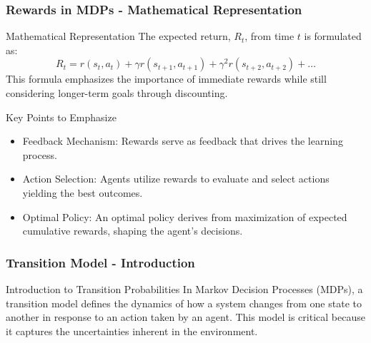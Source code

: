 \documentclass[aspectratio=169]{beamer}
\begin{document}
\begin{frame}[fragile]
    \frametitle{Rewards in MDPs - Mathematical Representation}
    \begin{block}{Mathematical Representation}
        The expected return, $R_t$, from time $t$ is formulated as:
        \begin{equation}
            R_t = r(s_t, a_t) + \gamma r(s_{t+1}, a_{t+1}) + \gamma^2 r(s_{t+2}, a_{t+2}) + \ldots
        \end{equation}
        This formula emphasizes the importance of immediate rewards while still considering longer-term goals through discounting.
    \end{block}

    \begin{block}{Key Points to Emphasize}
        \begin{itemize}
            \item Feedback Mechanism: Rewards serve as feedback that drives the learning process.
            \item Action Selection: Agents utilize rewards to evaluate and select actions yielding the best outcomes.
            \item Optimal Policy: An optimal policy derives from maximization of expected cumulative rewards, shaping the agent's decisions.
        \end{itemize}
    \end{block}
\end{frame}

\begin{frame}[fragile]
    \frametitle{Transition Model - Introduction}
    \begin{block}{Introduction to Transition Probabilities}
        In Markov Decision Processes (MDPs), a transition model defines the dynamics of how a system changes from one state to another in response to an action taken by an agent. This model is critical because it captures the uncertainties inherent in the environment.
    \end{block}
\end{frame}
\end{document}
